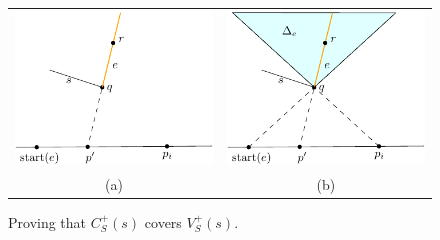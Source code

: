 \documentclass{patmorin}
\begin{document}
\begin{figure}
  \begin{center}
    \begin{tabular}{cc}
      \includegraphics{cover-proof-a} &
      \includegraphics{cover-proof-b} \\
      (a) & (b)
    \end{tabular}
  \end{center}
  \caption{Proving that $C^+_S(s)$ covers $V^+_S(s)$.}
\end{figure}
\end{document}
